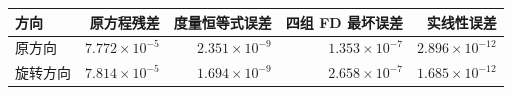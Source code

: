\begin{tabular}{lrrrr}
\toprule
方向 & 原方程残差 & 度量恒等式误差 & 四组 FD 最坏误差 & 实线性误差 \\
\midrule
原方向 & $7.772\times10^{-5}$ & $2.351\times10^{-9}$ & $1.353\times10^{-7}$ & $2.896\times10^{-12}$ \\
旋转方向 & $7.814\times10^{-5}$ & $1.694\times10^{-9}$ & $2.658\times10^{-7}$ & $1.685\times10^{-12}$ \\
\bottomrule
\end{tabular}
